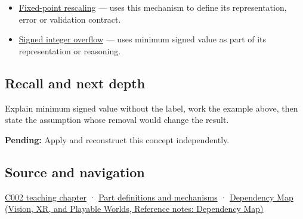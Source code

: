 \hypertarget{appendix-05f39b10364d-used-by}{}

\begin{itemize}
\item
  \hyperref[appendix-3333db47830f]{Fixed-point rescaling} --- uses this mechanism to define its representation, error or validation contract.
\item
  \hyperref[appendix-1a599c924a4e]{Signed integer overflow} --- uses minimum signed value as part of its representation or reasoning.
\end{itemize}

\subsection{Recall and next depth}\label{appendix-05f39b10364d-recall-and-next-depth}

\hypertarget{appendix-05f39b10364d-recall-and-next-depth}{}

Explain minimum signed value without the label, work the example above, then state the assumption whose removal would change the result.

\textbf{Pending:} Apply and reconstruct this concept independently.

\subsection{Source and navigation}\label{appendix-05f39b10364d-source-and-navigation}

\hypertarget{appendix-05f39b10364d-source-and-navigation}{}

\hyperref[01-foundations-i-ch001-arithmetic-becomes-a-policy]{C002 teaching chapter} · \hyperref[appendix-fd090d982a15]{Part definitions and mechanisms} · \href{../07-Vision-XR-and-Playable-Worlds/main.pdf\#nameddest=appendix-4ad47bdd269a}{Dependency Map (Vision, XR, and Playable Worlds, Reference notes: Dependency Map)}
